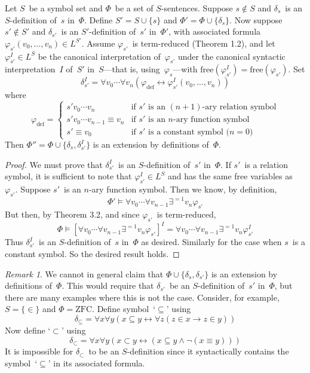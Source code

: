 \documentclass[letterpaper]{article}
\newcommand{\lequ}{\equiv}
\newcommand{\limp}{\rightarrow}
\newcommand{\liff}{\leftrightarrow}
\newcommand{\free}{\mathrm{free}}
\newcommand{\union}{\cup}
\newcommand{\ZFC}{\mathrm{ZFC}}
\theoremstyle{remark}
\newtheorem*{rmk}{Remark}
\begin{document}
Let $S$~be a symbol set and $\Phi$~be a set of $S$-sentences. Suppose $s\not\in S$ and $\delta_s$~is an $S$-definition of~$s$ in~$\Phi$. Define $S'=S\union\{s\}$ and $\Phi'=\Phi\union\{\delta_s\}$. Now suppose $s'\not\in S'$ and $\delta_{s'}$~is an $S'$-definition of~$s'$ in~$\Phi'$, with associated formula $\varphi_{s'}(v_0,\ldots,v_n)\in L^{S'}$. Assume $\varphi_{s'}$~is term-reduced (Theorem 1.2), and let $\varphi_{s'}^I\in L^S$ be the canonical interpretation of~$\varphi_{s'}$ under the canonical syntactic interpretation~$I$ of~$S'$ in~$S$---that is, using~$\varphi_s$---with $\free(\varphi_{s'}^I)=\free(\varphi_{s'})$. Set
$$\delta_{s'}^I=\forall v_0\cdots\forall v_n(\varphi_{\mathrm{def}}\liff\varphi_{s'}^I(v_0,\ldots,v_n))$$
where
$$\varphi_{\mathrm{def}}=\begin{cases}s'v_0\cdots v_n&\text{if $s'$~is an $(n+1)$-ary relation symbol}\\s' v_0\cdots v_{n-1}\lequ v_n&\text{if $s'$~is an $n$-ary function symbol}\\s'\lequ v_0&\text{if $s'$~is a constant symbol ($n=0$)}\end{cases}$$
Then $\Phi''=\Phi\union\{\delta_s,\delta_{s'}^I\}$ is an extension by definitions of~$\Phi$.
\begin{proof}
We must prove that $\delta_{s'}^I$~is an $S$-definition of~$s'$ in~$\Phi$. If $s'$~is a relation symbol, it is sufficient to note that $\varphi_{s'}^I\in L^S$ and has the same free variables as~$\varphi_{s'}$. Suppose $s'$~is an $n$-ary function symbol. Then we know, by definition,
$$\Phi'\models\forall v_0\cdots\forall v_{n-1}\exists^{=1}v_n\varphi_{s'}$$
But then, by Theorem 3.2, and since $\varphi_{s'}$~is term-reduced,
$$\Phi\models[\forall v_0\cdots\forall v_{n-1}\exists^{=1}v_n\varphi_{s'}]^I=\forall v_0\cdots\forall v_{n-1}\exists^{=1}v_n\varphi_{s'}^I$$
Thus $\delta_{s'}^I$~is an $S$-definition of~$s$ in~$\Phi$ as desired. Similarly for the case when $s$~is a constant symbol. So the desired result holds.
\end{proof}
\begin{rmk}
We cannot in general claim that $\Phi\union\{\delta_s,\delta_{s'}\}$ is an extension by definitions of~$\Phi$. This would require that $\delta_{s'}$~be an $S$-definition of~$s'$ in~$\Phi$, but there are many examples where this is not the case. Consider, for example, $S=\{\in\}$ and $\Phi=\ZFC$. Define symbol~`$\subseteq$' using
$$\delta_{\subseteq}=\forall x\forall y(x\subseteq y\liff \forall z(z\in x\limp z\in y))$$
Now define `$\subset$' using
$$\delta_{\subset}=\forall x\forall y(x\subset y\liff(x\subseteq y\land\lnot(x\lequ y)))$$
It is impossible for $\delta_{\subset}$~to be an $S$-definition since it syntactically contains the symbol~`$\subseteq$' in its associated formula.
\end{rmk}
\end{document}
